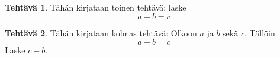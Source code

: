 \documentclass[
]{book}
\theoremstyle{definition}
\theoremstyle{definition}
\theoremstyle{definition}
\newtheorem{exercise}{Tehtävä}[chapter]
\theoremstyle{definition}
\theoremstyle{remark}
\begin{document}
\begin{exercise}
\protect\hypertarget{exr:unnamed-chunk-10}{}\label{exr:unnamed-chunk-10}Tähän kirjataan toinen tehtävä: laske
\begin{equation*}
  a-b=c
\end{equation*}
\end{exercise}

\begin{exercise}
\protect\hypertarget{exr:unnamed-chunk-11}{}\label{exr:unnamed-chunk-11}Tähän kirjataan kolmas tehtävä: Olkoon \(a\) ja \(b\) sekä \(c\). Tällöin
\begin{equation*}
  a-b=c
\end{equation*}
Laske \(c-b\).
\end{exercise}

  
\end{document}
